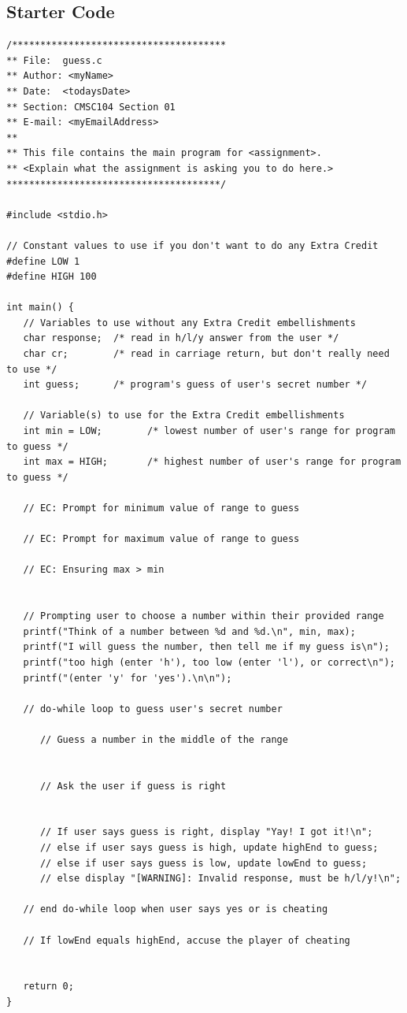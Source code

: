 \documentclass[letter,11pt]{article}
\begin{document}
\subsection*{Starter Code}
\begin{verbatim}
/**************************************
** File:  guess.c
** Author: <myName>
** Date:  <todaysDate>
** Section: CMSC104 Section 01
** E-mail: <myEmailAddress>
**
** This file contains the main program for <assignment>.
** <Explain what the assignment is asking you to do here.>
**************************************/

#include <stdio.h>

// Constant values to use if you don't want to do any Extra Credit
#define LOW 1
#define HIGH 100

int main() {
   // Variables to use without any Extra Credit embellishments
   char response;  /* read in h/l/y answer from the user */
   char cr;        /* read in carriage return, but don't really need to use */
   int guess;      /* program's guess of user's secret number */

   // Variable(s) to use for the Extra Credit embellishments
   int min = LOW;        /* lowest number of user's range for program to guess */
   int max = HIGH;       /* highest number of user's range for program to guess */

   // EC: Prompt for minimum value of range to guess

   // EC: Prompt for maximum value of range to guess
   
   // EC: Ensuring max > min


   // Prompting user to choose a number within their provided range
   printf("Think of a number between %d and %d.\n", min, max);
   printf("I will guess the number, then tell me if my guess is\n");
   printf("too high (enter 'h'), too low (enter 'l'), or correct\n");
   printf("(enter 'y' for 'yes').\n\n");

   // do-while loop to guess user's secret number
   
      // Guess a number in the middle of the range
      

      // Ask the user if guess is right
      

      // If user says guess is right, display "Yay! I got it!\n";
      // else if user says guess is high, update highEnd to guess;
      // else if user says guess is low, update lowEnd to guess;
      // else display "[WARNING]: Invalid response, must be h/l/y!\n";
      
   // end do-while loop when user says yes or is cheating

   // If lowEnd equals highEnd, accuse the player of cheating
   

   return 0;
}
\end{verbatim}
\end{document}
